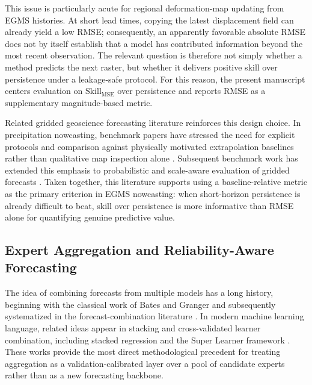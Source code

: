 \documentclass[lettersize,journal]{IEEEtran}
\begin{document}
This issue is particularly acute for regional deformation-map updating from EGMS histories. At short lead times, copying the latest displacement field can already yield a low RMSE; consequently, an apparently favorable absolute RMSE does not by itself establish that a model has contributed information beyond the most recent observation. The relevant question is therefore not simply whether a method predicts the next raster, but whether it delivers positive skill over persistence under a leakage-safe protocol. For this reason, the present manuscript centers evaluation on \(\mathrm{Skill}_{\mathrm{MSE}}\) over persistence and reports RMSE as a supplementary magnitude-based metric.

Related gridded geoscience forecasting literature reinforces this design choice. In precipitation nowcasting, benchmark papers have stressed the need for explicit protocols and comparison against physically motivated extrapolation baselines rather than qualitative map inspection alone \cite{shi2017deep,rasp2020weatherbench}. Subsequent benchmark work has extended this emphasis to probabilistic and scale-aware evaluation of gridded forecasts \cite{rahimi2023gpmnowcasting}. 
Taken together, this literature supports using a baseline-relative metric as the primary criterion in EGMS nowcasting: when short-horizon persistence is already difficult to beat, skill over persistence is more informative than RMSE alone for quantifying genuine predictive value.


\subsection{Expert Aggregation and Reliability-Aware Forecasting}

The idea of combining forecasts from multiple models has a long history, beginning with the classical work of Bates and Granger and subsequently systematized in the forecast-combination literature \cite{bates1969combination,clemen1989combining}. In modern machine learning language, related ideas appear in stacking and cross-validated learner combination, including stacked regression \cite{breiman1996stacked} and the Super Learner framework \cite{vanderlaan2007superlearner}. These works provide the most direct methodological precedent for treating aggregation as a validation-calibrated layer over a pool of candidate experts rather than as a new forecasting backbone.
\end{document}
